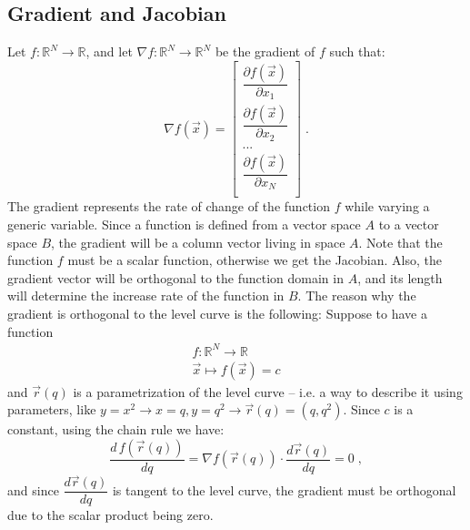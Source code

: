 \documentclass[12pt,a4paper]{article}
\begin{document}
\subsection{Gradient and Jacobian}
Let $f : \mathbb{R}^N \to \mathbb{R}$, and let $\nabla f : \mathbb{R}^N \to \mathbb{R}^N$ be the gradient of $f$ such that:
\begin{equation*}
	\nabla f(\vec{x}) = \begin{bmatrix}
		\dfrac{\partial f(\vec{x})}{\partial x_1}\\[12pt]
		\dfrac{\partial f(\vec{x})}{\partial x_2}\\[12pt]
		...\\
		\dfrac{\partial f(\vec{x})}{\partial x_N}\\[12pt]
	\end{bmatrix}\;.
\end{equation*}
The gradient represents the rate of change of the function $f$ while varying a generic variable. Since a function is defined from a vector space $A$ to a vector space $B$, the gradient will be a column vector living in space $A$. Note that the function $f$ must be a scalar function, otherwise we get the Jacobian.
Also, the gradient vector will be orthogonal to the function domain in $A$, and its length will determine the increase rate of the function in $B$.
The reason why the gradient is orthogonal to the level curve is the following:
Suppose to have a function
\begin{align*}
	f : \mathbb{R}^N \to \mathbb{R} \\
	\vec{x} \mapsto f(\vec{x})=c
\end{align*}
and $\vec{r}(q)$ is a parametrization of the level curve -- i.e. a way to describe it using parameters, like $y=x^2 \rightarrow x=q, y=q^2 \rightarrow \vec{r}(q) = (q, q^2)$.
Since $c$ is a constant, using the chain rule we have:
$$
\dfrac{d \,f(\vec{r}(q))}{dq} = \nabla f(\vec{r}(q)) \cdot \dfrac{d \vec{r}(q)}{dq} = 0\;,
$$
and since $\dfrac{d \vec{r}(q)}{dq}$ is tangent to the level curve, the gradient must be orthogonal due to the scalar product being zero.
\end{document}
